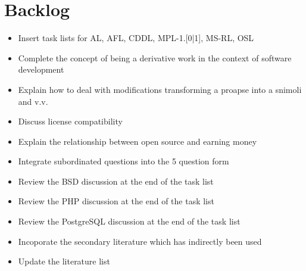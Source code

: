 %
%
%
%


\chapter*{Backlog} 

\begin{footnotesize}
\begin{itemize}
  \item Insert task lists for AL, AFL, CDDL, MPL-1.[0|1], MS-RL, OSL
  \item Complete the concept of being a derivative work in the context of
  software development
  \item Explain how to deal with modifications transforming a proapse into a
  snimoli and v.v.
  \item Discuss license compatibility
  \item Explain the relationship between open source and earning money
  \item Integrate subordinated questions into the 5 question form
  \item Review the BSD discussion at the end of the task list 
  \item Review the PHP discussion at the end of the task list
  \item Review the PostgreSQL discussion at the end of the task list

  \item Incoporate the secondary literature which has indirectly been used
  \item Update the literature list
\end{itemize}
\end{footnotesize}

%


